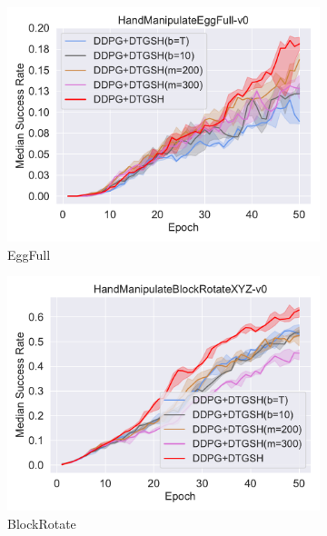 \begin{figure}[h!]
\begin{subfigure}[t]{0.49\textwidth}
    \includegraphics[width=\textwidth]{figures/chapter4/HandManipulateEggFull-v0_ab2.pdf}
    \caption{EggFull}
    \label{subfig:baseline_handegg_ab2}
  \end{subfigure}\hfill
  \begin{subfigure}[t]{0.49\textwidth}
    \includegraphics[width=\textwidth]{figures/chapter4/HandManipulateBlockRotateXYZ-v0_ab2.pdf}
    \caption{BlockRotate}
    \label{subfig:baseline_handblock_ab2}
  \end{subfigure}\hfill
  \begin{subfigure}[t]{0.49\textwidth}

\end{subfigure}
\end{figure}
